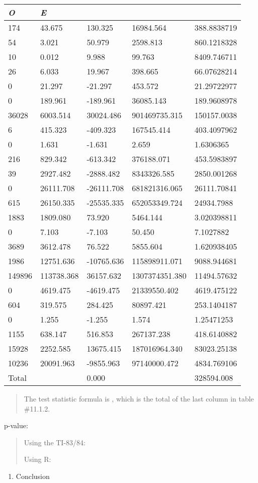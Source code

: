 \documentclass[]{book}
\providecommand{\tightlist}{%
  \setlength{\itemsep}{0pt}\setlength{\parskip}{0pt}}
\begin{document}
\begin{longtable}[]{@{}lllll@{}}
\toprule
\emph{O} & \emph{E} & & &\tabularnewline
\midrule
\endhead
174 & 43.675 & 130.325 & 16984.564 & 388.8838719\tabularnewline
54 & 3.021 & 50.979 & 2598.813 & 860.1218328\tabularnewline
10 & 0.012 & 9.988 & 99.763 & 8409.746711\tabularnewline
26 & 6.033 & 19.967 & 398.665 & 66.07628214\tabularnewline
0 & 21.297 & -21.297 & 453.572 & 21.29722977\tabularnewline
0 & 189.961 & -189.961 & 36085.143 & 189.9608978\tabularnewline
36028 & 6003.514 & 30024.486 & 901469735.315 & 150157.0038\tabularnewline
6 & 415.323 & -409.323 & 167545.414 & 403.4097962\tabularnewline
0 & 1.631 & -1.631 & 2.659 & 1.6306365\tabularnewline
216 & 829.342 & -613.342 & 376188.071 & 453.5983897\tabularnewline
39 & 2927.482 & -2888.482 & 8343326.585 & 2850.001268\tabularnewline
0 & 26111.708 & -26111.708 & 681821316.065 & 26111.70841\tabularnewline
615 & 26150.335 & -25535.335 & 652053349.724 & 24934.7988\tabularnewline
1883 & 1809.080 & 73.920 & 5464.144 & 3.020398811\tabularnewline
0 & 7.103 & -7.103 & 50.450 & 7.1027882\tabularnewline
3689 & 3612.478 & 76.522 & 5855.604 & 1.620938405\tabularnewline
1986 & 12751.636 & -10765.636 & 115898911.071 & 9088.944681\tabularnewline
149896 & 113738.368 & 36157.632 & 1307374351.380 & 11494.57632\tabularnewline
0 & 4619.475 & -4619.475 & 21339550.402 & 4619.475122\tabularnewline
604 & 319.575 & 284.425 & 80897.421 & 253.1404187\tabularnewline
0 & 1.255 & -1.255 & 1.574 & 1.25471253\tabularnewline
1155 & 638.147 & 516.853 & 267137.238 & 418.6140882\tabularnewline
15928 & 2252.585 & 13675.415 & 187016964.340 & 83023.25138\tabularnewline
10236 & 20091.963 & -9855.963 & 97140000.472 & 4834.769106\tabularnewline
Total & & 0.000 & & 328594.008\tabularnewline
\bottomrule
\end{longtable}

\begin{quote}
The test statistic formula is , which is the total of the last column in table \#11.1.2.
\end{quote}

p-value:

\begin{quote}
Using the TI-83/84:

Using R:
\end{quote}

\begin{enumerate}
\def\labelenumi{\arabic{enumi}.}
\setcounter{enumi}{3}
\tightlist
\item
  Conclusion
\end{enumerate}
\end{document}
